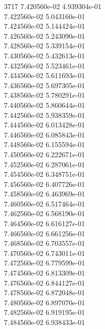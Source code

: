 3717	7.420560e-02	4.939304e-01	\\ 	7.422560e-02	5.043160e-01	\\ 	7.424560e-02	5.144424e-01	\\ 	7.426560e-02	5.243090e-01	\\ 	7.428560e-02	5.339154e-01	\\ 	7.430560e-02	5.432613e-01	\\ 	7.432560e-02	5.523461e-01	\\ 	7.434560e-02	5.611693e-01	\\ 	7.436560e-02	5.697305e-01	\\ 	7.438560e-02	5.780291e-01	\\ 	7.440560e-02	5.860644e-01	\\ 	7.442560e-02	5.938359e-01	\\ 	7.444560e-02	6.013428e-01	\\ 	7.446560e-02	6.085843e-01	\\ 	7.448560e-02	6.155594e-01	\\ 	7.450560e-02	6.222671e-01	\\ 	7.452560e-02	6.287061e-01	\\ 	7.454560e-02	6.348751e-01	\\ 	7.456560e-02	6.407726e-01	\\ 	7.458560e-02	6.463969e-01	\\ 	7.460560e-02	6.517464e-01	\\ 	7.462560e-02	6.568190e-01	\\ 	7.464560e-02	6.616127e-01	\\ 	7.466560e-02	6.661256e-01	\\ 	7.468560e-02	6.703557e-01	\\ 	7.470560e-02	6.743011e-01	\\ 	7.472560e-02	6.779599e-01	\\ 	7.474560e-02	6.813309e-01	\\ 	7.476560e-02	6.844127e-01	\\ 	7.478560e-02	6.872048e-01	\\ 	7.480560e-02	6.897070e-01	\\ 	7.482560e-02	6.919195e-01	\\ 	7.484560e-02	6.938433e-01	\\ \hline
